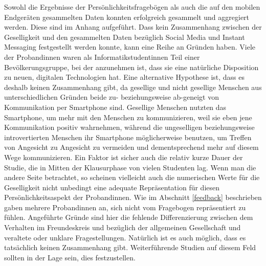 Sowohl die Ergebnisse der Persönlichkeitsfragebögen als auch die auf den mobilen Endgeräten gesammelten Daten konnten erfolgreich gesammelt und aggregiert werden.
Diese sind im Anhang aufgeführt.
Dass kein Zusammenhang zwischen der Geselligkeit und den gesammelten Daten bezüglich Social Media und Instant Messaging festgestellt werden konnte, kann eine Reihe an Gründen haben.
Viele der Probandinnen waren als Informatikstudentinnen Teil einer Bevölkerungsgruppe, bei der anzunehmen ist, dass sie eine natürliche Disposition zu neuen, digitalen Technologien hat.
Eine alternative Hypothese ist, dass es deshalb keinen Zusammenhang gibt, da gesellige und nicht gesellige Menschen aus unterschiedlichen Gründen beide zu- beziehungsweise ab-geneigt von Kommunikation per Smartphone sind.
Gesellige Menschen nutzten das Smartphone, um mehr mit den Menschen zu kommunizieren, weil sie eben jene Kommunikation positiv wahrnehmen,
während die ungeselligen beziehungsweise introvertierten Menschen ihr Smartphone möglicherweise benutzen, um Treffen von Angesicht zu Angesicht zu vermeiden und dementsprechend mehr auf diesem Wege kommunizieren.
Ein Faktor ist sicher auch die relativ kurze Dauer der Studie, die in Mitten der Klausurphase von vielen Studenten lag.
Wenn man die andere Seite betrachtet, so scheinen vielleicht auch die numerischen Werte für die Geselligkeit nicht unbedingt eine adequate Repräsentation für diesen Persönlichkeitsaspekt der Probandinnen.
Wie im Abschnitt \ref{feedback} beschrieben gaben mehrere Probandinnen an, sich nicht vom Fragebogen repräsentiert zu fühlen.
Angeführte Gründe sind hier die fehlende Differenzierung zwischen dem Verhalten im Freundeskreis und bezüglich der allgemeinen Gesellschaft und veraltete oder unklare Fragestellungen.
Natürlich ist es auch möglich, dass es tatsächlich keinen Zusammenhang gibt.
Weiterführende Studien auf diesem Feld sollten in der Lage sein, dies festzustellen.




